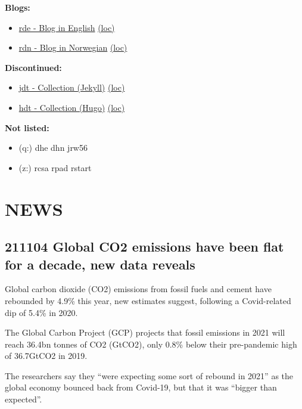 \documentclass[
]{book}
\providecommand{\tightlist}{%
  \setlength{\itemsep}{0pt}\setlength{\parskip}{0pt}}
\begin{document}
\textbf{Blogs:}

\begin{itemize}
\tightlist
\item
  \href{https://dyrehaugen.github.io/rde}{rde - Blog in English} \href{http://localhost/rde}{(loc)}
\item
  \href{https://dyrehaugen.github.io/rdn}{rdn - Blog in Norwegian} \href{http://localhost/rdn}{(loc)}
\end{itemize}

\textbf{Discontinued:}

\begin{itemize}
\tightlist
\item
  \href{https://dyrehaugen.github.io/jdt}{jdt - Collection (Jekyll)} \href{http://localhost/jdt}{(loc)}
\item
  \href{https://dyrehaugen.github.io/hdt}{hdt - Collection (Hugo)} \href{http://localhost/hdt}{(loc)}
\end{itemize}

\textbf{Not listed:}

\begin{itemize}
\tightlist
\item
  (q:) dhe dhn jrw56
\item
  (z:) rcsa rpad rstart
\end{itemize}

\hypertarget{news}{%
\chapter{NEWS}\label{news}}

\hypertarget{global-co2-emissions-have-been-flat-for-a-decade-new-data-reveals}{%
\section{211104 Global CO2 emissions have been flat for a decade, new data reveals}\label{global-co2-emissions-have-been-flat-for-a-decade-new-data-reveals}}

Global carbon dioxide (CO2) emissions from fossil fuels and cement have rebounded by 4.9\% this year, new estimates suggest, following a Covid-related dip of 5.4\% in 2020.

The Global Carbon Project (GCP) projects that fossil emissions in 2021 will reach 36.4bn tonnes of CO2 (GtCO2), only 0.8\% below their pre-pandemic high of 36.7GtCO2 in 2019.

The researchers say they ``were expecting some sort of rebound in 2021'' as the global economy bounced back from Covid-19, but that it was ``bigger than expected''.
\end{document}
